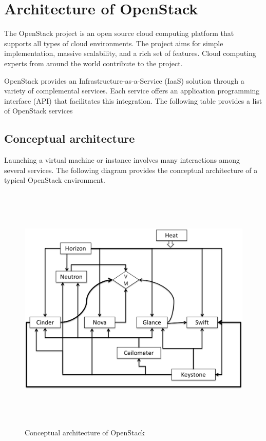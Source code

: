  \section{Architecture of OpenStack}
     The OpenStack project is an open source cloud computing platform that supports all types of cloud environments. The project aims for simple implementation, massive scalability, and a rich set of features. Cloud computing experts from around the world contribute to the project.
     \par
     OpenStack provides an Infrastructure-as-a-Service (IaaS) solution through a variety of complemental services. Each service offers an application programming interface (API) that facilitates this integration. The following table provides a list of OpenStack services
     \clearpage
     \subsection{Conceptual architecture}
         \par
         Launching a virtual machine or instance involves many interactions among several services. The following diagram provides the conceptual architecture of a typical OpenStack environment.
         \begin{figure}[h]
         \centering
         \includegraphics[height=12cm,width=14cm]{images/arch.png}
         \caption{Conceptual architecture of OpenStack} %
         \label{fig:my_label}
         \end{figure}
     
